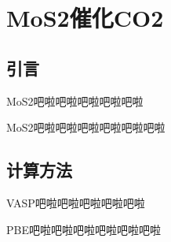 \chapter{MoS2催化CO2}

\section{引言}

MoS2吧啦吧啦吧啦吧啦吧啦

MoS2吧啦吧啦吧啦吧啦吧啦吧啦


\section{计算方法}


VASP\cite{betts2005aging}吧啦吧啦吧啦吧啦吧啦

PBE吧啦吧啦吧啦吧啦吧啦吧啦
